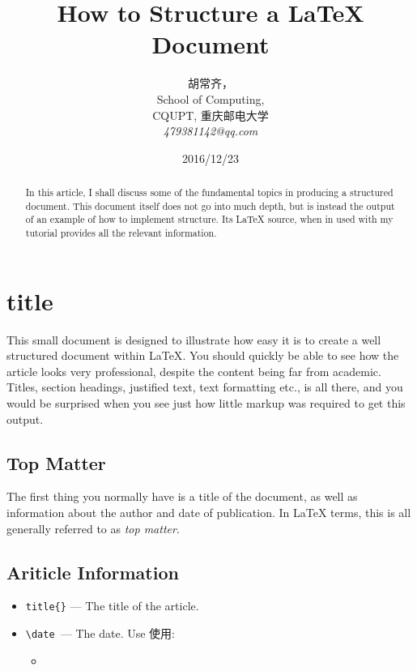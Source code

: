 \documentclass{ctexart}
\begin{document}
\title{How to Structure a \LaTeX{} Document}
\author{胡常齐， \\
  School of Computing, \\
  CQUPT, 重庆邮电大学\\
  \emph{479381142@qq.com}}
\date{2016/12/23}
\maketitle{}
\begin{abstract}
  In this article, I shall discuss some of the fundamental topics in
  producing a structured document.  This document itself does not go into
  much depth, but is instead the output of an example of how to implement
  structure. Its \LaTeX{} source, when in used with my tutorial
  provides all the relevant information.
\end{abstract}

\section{title}
\label{sec:introduction}

  This small document is designed to illustrate how easy it is to create a well structured
  document within \LaTeX\cite{}.  You should quickly be able to see how the article
  looks very professional, despite the content being far from academic.  Titles, section
  headings, justified text, text formatting etc., is all there, and you would be surprised
 when you see just how little markup was required to get this output.

\subsection{Top Matter}
\label{sec:top-matter}

 The first thing you normally have is a title of the document, as well as
 information about the author and date of publication.  In \LaTeX{} terms,
 this is all generally referred to as \emph{top matter}.

\subsection{Ariticle Information}
\label{sec:article-information}

\begin{itemize}
\item \verb|title{}| --- The title of the article.
\item \verb|\date |--- The date. Use 使用:
  \begin{itemize}
  \item 
  \end{itemize}
\end{itemize}
\end{document}
